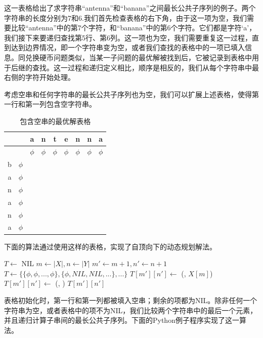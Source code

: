 \documentclass[b5paper]{ctexart}
\begin{document}
这一表格给出了求字符串“antenna”和“banana”之间最长公共子序列的例子。两个字符串的长度分别为7和6.我们首先检查表格的右下角，由于这一项为空，我们需要比较“antenna”中的第7个字符，和“banana”中的第6个字符。它们都是字符‘a’，我们接下来要递归查找第5行、第6列。这一项也为空，我们需要重复这一过程，直到达到边界情况，即一个字符串变为空，或者我们查找的表格中的一项已填入信息。同兑换硬币问题类似，当某一子问题的最优解被找到后，它被记录到表格中用于后继的查找。这一过程和递归定义相比，顺序是相反的，我们从每个字符串中最右侧的字符开始处理。

考虑空串和任何字符串的最长公共子序列也为空，我们可以扩展上述表格，使得第一行和第一列包含空字符串。

\begin{table}[htbp]
\centering
\begin{tabular}{|c|c|c|c|c|c|c|c|c|}
\hline
 & & a & n & t & e & n & n & a \\
\hline
 & & $\phi$ & $\phi$ & $\phi$ & $\phi$ & $\phi$ & $\phi$ & $\phi$ \\
\hline
b & $\phi$ & & & & & & & \\
\hline
a & $\phi$ & & & & & & & \\
\hline
n & $\phi$ & & & & & & & \\
\hline
a & $\phi$ & & & & & & & \\
\hline
n & $\phi$ & & & & & & & \\
\hline
a & $\phi$ & & & & & & & \\
\hline
\end{tabular}
\caption{包含空串的最优解表格}
\end{table}

下面的算法通过使用这样的表格，实现了自顶向下的动态规划解法。

\begin{algorithmic}[1]
\State $T \gets$ NIL
  \State $m \gets |X|, n \gets |Y|$
  \State $m' \gets m+1, n' \gets n+1$
    \State $T \gets \{\{\phi, \phi, ..., \phi\}, \{\phi, NIL, NIL, ...\}, ...\}$ 
  \EndIf
      \State $T[m'][n'] \gets$ (, $X[m]$)
    \Else
      \State $T[m'][n'] \gets$ (, )
    \EndIf
  \EndIf
  \State \Return $T[m'][n']$
\EndFunction
\end{algorithmic}

表格初始化时，第一行和第一列都被填入空串；剩余的项都为NIL。除非任何一个字符串为空，或者表格中的项不为NIL，我们比较两个字符串中的最后一个元素，并且递归计算子串间的最长公共子序列。下面的Python例子程序实现了这一算法。
\end{document}
